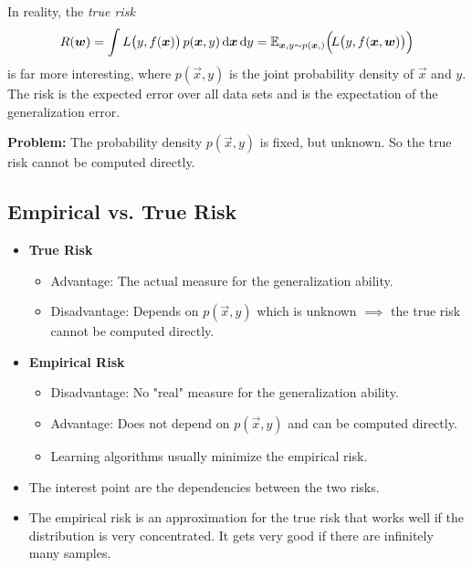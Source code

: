 		In reality, the \emph{true risk}
		\begin{equation}
			R(\bm{w}) = \int L\big(y, f(\bm{x})\big) \, p(\bm{x}, y) \dd{\bm{x}} \dd{y} = \mathbb{E}_{ \bm{x}, y \sim p(\bm{x}, ) }\Big(\! L\big(y, f(\bm{x}, \bm{w})\big) \Big)
		\end{equation}
		is far more interesting, where \( p(\vec{x}, y) \) is the joint probability density of \(\vec{x}\) and \(y\). The risk is the expected error over all data sets and is the expectation of the generalization error.
		
		\textbf{Problem:} The probability density \( p(\vec{x}, y) \) is fixed, but unknown. So the true risk cannot be computed directly.

		\subsection{Empirical vs. True Risk}
			\begin{itemize}
				\item \textbf{True Risk}
					\begin{itemize}
						\item Advantage: The actual measure for the generalization ability.
						\item Disadvantage: Depends on \( p(\vec{x}, y) \) which is unknown \( \implies \) the true risk cannot be computed directly.
					\end{itemize}
				\item \textbf{Empirical Risk}
					\begin{itemize}
						\item Disadvantage: No "real" measure for the generalization ability.
						\item Advantage: Does not depend on \( p(\vec{x}, y) \) and can be computed directly.
						\item Learning algorithms usually minimize the empirical risk.
					\end{itemize}
				\item The interest point are the dependencies between the two risks.
				\item The empirical risk is an approximation for the true risk that works well if the distribution is very concentrated. It gets very good if there are infinitely many samples.
			\end{itemize}

